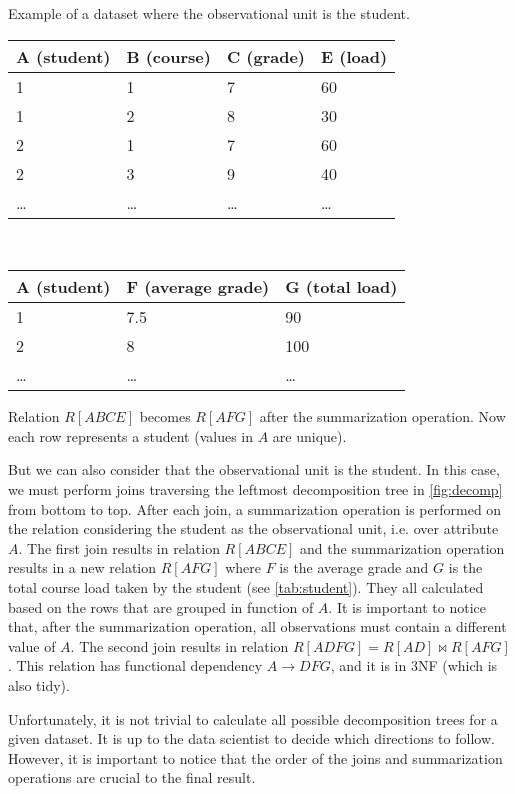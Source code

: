 \begin{tablebox}[label=tab:student]{Example of a dataset where the observational unit is the student.}
  \centering
  \begin{tabular}{llll}
    \toprule
    \textbf{A (student)} & \textbf{B (course)} & \textbf{C (grade)} & \textbf{E (load)} \\
    \midrule
    1 & 1 & 7 & 60 \\
    1 & 2 & 8 & 30 \\
    2 & 1 & 7 & 60 \\
    2 & 3 & 9 & 40 \\
    \dots & \dots & \dots & \dots \\
    \bottomrule
  \end{tabular}
  \\[1em]
  \begin{tabular}{lll}
    \toprule
    \textbf{A (student)} & \textbf{F (average grade)} & \textbf{G (total load)} \\
    \midrule
    1 & 7.5 & 90 \\
    2 & 8 & 100 \\
    \dots & \dots & \dots \\
    \bottomrule
  \end{tabular}
  \tcblower
  Relation $R[ABCE]$ becomes $R[AFG]$ after the summarization operation.  Now each row
  represents a student (values in $A$ are unique).
\end{tablebox}

But we can also consider that the observational unit is the student.  In this case, we
must perform joins traversing the leftmost decomposition tree in \cref{fig:decomp} from
bottom to top.  After each join, a summarization operation is performed on the relation
considering the student as the observational unit, i.e. over attribute $A$.  The first
join results in relation $R[ABCE]$ and the summarization operation results in a new
relation $R[AFG]$ where $F$ is the average grade and $G$ is the total course load taken by
the student (see \cref{tab:student}).  They all calculated based on the rows that are grouped in function of $A$.
It is important to notice that, after the summarization operation, all observations must
contain a different value of $A$.  The second join results in relation $R[ADFG] = R[AD]
\bowtie R[AFG]$.  This relation has functional dependency $A \to DFG$, and it is in 3NF
(which is also tidy).

Unfortunately, it is not trivial to calculate all possible decomposition trees for a given
dataset.  It is up to the data scientist to decide which directions to follow.  However,
it is important to notice that the order of the joins and summarization operations are
crucial to the final result.

